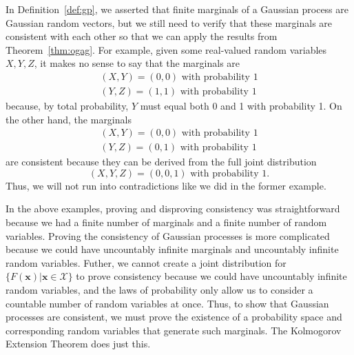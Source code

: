 In Definition~\ref{def:gp}, we asserted that finite marginals of a Gaussian process are Gaussian random vectors, but we still need to verify that these marginals are consistent with each other so that we can apply the results from Theorem~\ref{thm:ogag}.
For example, given some real-valued random variables $X, Y, Z$, it makes no sense to say that the marginals are
\begin{align*}
    (X, Y) = (0, 0) \text{ with probability 1} \\
    (Y, Z) = (1, 1) \text{ with probability 1}
\end{align*}
because, by total probability, $Y$ must equal both 0 and 1 with probability 1.
On the other hand, the marginals
\begin{align*}
    (X, Y) = (0, 0) \text{ with probability 1} \\
    (Y, Z) = (0, 1) \text{ with probability 1}
\end{align*}
are consistent because they can be derived from the full joint distribution
\begin{equation*}
    (X, Y, Z) = (0, 0, 1)  \text{ with probability 1}.
\end{equation*}
Thus, we will not run into contradictions like we did in the former example.

In the above examples, proving and disproving consistency was straightforward because we had a finite number of marginals and a finite number of random variables.
Proving the consistency of Gaussian processes is more complicated because we could have uncountably infinite marginals and uncountably infinite random variables.
Futher, we cannot create a joint distribution for $\{ F(\mathbf{x}) | \mathbf{x} \in \mathcal{X} \}$ to prove consistency because we could have uncountably infinite random variables, and the laws of probability only allow us to consider a countable number of random variables at once.
Thus, to show that Gaussian processes are consistent, we must prove the existence of a probability space and corresponding random variables that generate such marginals.
The Kolmogorov Extension Theorem does just this.

